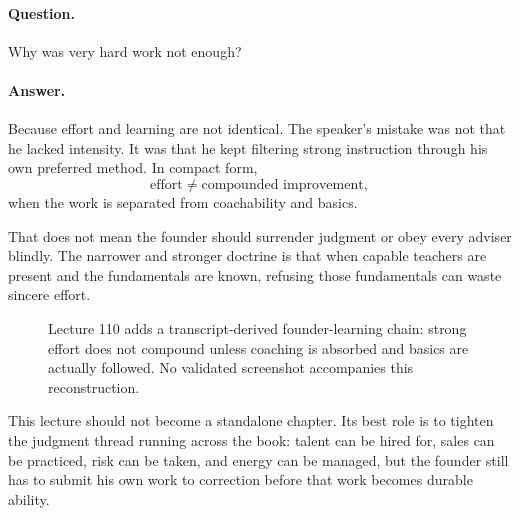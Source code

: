 \documentclass[11pt,oneside]{book}
\begin{document}
\paragraph{Question.}
Why was very hard work not enough?

\paragraph{Answer.}
Because effort and learning are not identical. The speaker's mistake was not that he lacked intensity. It was that he kept filtering strong instruction through his own preferred method. In compact form,
\[
\text{effort}\neq \text{compounded improvement},
\]
when the work is separated from coachability and basics.

That does not mean the founder should surrender judgment or obey every adviser blindly. The narrower and stronger doctrine is that when capable teachers are present and the fundamentals are known, refusing those fundamentals can waste sincere effort.

\begin{figure}
\centering
{}
\caption{Lecture 110 adds a transcript-derived founder-learning chain: strong effort does not compound unless coaching is absorbed and basics are actually followed. No validated screenshot accompanies this reconstruction.}
\end{figure}

This lecture should not become a standalone chapter. Its best role is to tighten the judgment thread running across the book: talent can be hired for, sales can be practiced, risk can be taken, and energy can be managed, but the founder still has to submit his own work to correction before that work becomes durable ability.
\end{document}
